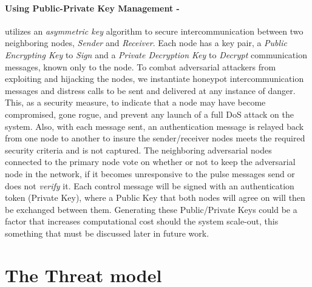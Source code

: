 \documentclass[grad,lot,lof,11pt,oneside,onehalfspace]{RUthesis}
\begin{document}
\paragraph{Using Public-Private Key Management -} utilizes an \textit{asymmetric key} algorithm to secure intercommunication between two neighboring nodes, \textit{Sender} and \textit{Receiver}. Each node has a key pair, a \textit{Public Encrypting Key} to \textit{Sign} and a \textit{Private Decryption Key} to \textit{Decrypt} communication messages, known only to the node. To combat adversarial attackers from exploiting and hijacking the nodes, we instantiate honeypot intercommunication messages and distress calls to be sent and delivered at any instance of danger. This, as a security measure, to indicate that a node may have become compromised, gone rogue, and prevent any launch of a full DoS attack on the system. Also, with each message sent, an authentication message is relayed back from one node to another to insure the sender/receiver nodes meets the required security criteria and is not captured. The neighboring adversarial nodes connected to the primary node vote on whether or not to keep the adversarial node in the network, if it becomes unresponsive to the pulse messages send or does not \textit{verify} it.  Each control message will be signed with an authentication token (Private Key), where a Public Key that both nodes will agree on will then be exchanged between them. Generating these Public/Private Keys could be a factor that increases computational cost should the system scale-out, this something that must be discussed later in future work. 

\section{The Threat model}
\end{document}
